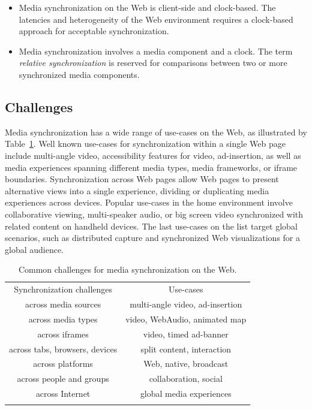 \documentclass[graybox]{svmult}
\begin{document}
\begin{itemize}
\item{Media synchronization on the Web is client-side and clock-based. The latencies and heterogeneity of the Web environment requires a clock-based approach for acceptable synchronization.}
\item{Media synchronization involves a media component and a clock. The term \emph{relative synchronization} is reserved for comparisons between two or more synchronized media components.}
\end{itemize}

\subsection{Challenges}

Media synchronization has a wide range of use-cases on the Web, as illustrated
by Table~\ref{tab:challenges}. Well known use-cases for synchronization within
a single Web page include multi-angle video, accessibility features for video,
ad-insertion, as well as media experiences spanning different media types,
media frameworks, or iframe boundaries. Synchronization across Web pages allow
Web pages to present alternative views into a single experience, dividing or
duplicating media experiences across devices. Popular use-cases in the home
environment involve collaborative viewing, multi-speaker audio, or big screen
video synchronized with related content on handheld devices. The last use-cases on the list
target global scenarios, such as distributed capture and
synchronized Web visualizations for a global audience.

\begin{table}
\centering
\caption{Common challenges for media synchronization on the Web.}
\label{tab:challenges}
\setlength{\tabcolsep}{10pt}
\begin{tabular}{cc}
\hline\noalign{\smallskip}
Synchronization challenges & Use-cases \\
\noalign{\smallskip}\svhline\noalign{\smallskip}
across media sources & multi-angle video, ad-insertion \\
across media types & video, WebAudio, animated map \\
across iframes & video, timed ad-banner \\
across tabs, browsers, devices & split content, interaction \\
across platforms & Web, native, broadcast \\
across people and groups & collaboration, social \\
across Internet & global media experiences \\
\noalign{\smallskip}\hline\noalign{\smallskip}
\end{tabular}
\end{table} 
\end{document}
